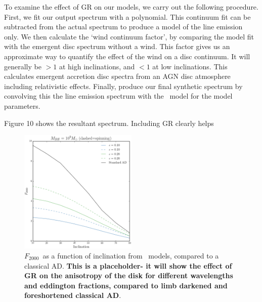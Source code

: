 \documentclass[preprint, a4paper, 11pt]{aastex}
\begin{document}
To examine the effect of GR on our models, we carry out the following procedure.
First, we fit our output spectrum with a polynomial. This continuum fit can 
be subtracted from the actual spectrum 
to produce a model of the line emission only. We then calculate the 
`wind continuum factor', by comparing the model fit with the emergent 
disc spectrum without a wind. This factor gives us an approximate way to quantify the 
effect of the wind on a disc continuum. It will generally be $>1$ at high inclinations,
and $<1$ at low inclinations. This calculates emergent accretion disc spectra from an AGN disc atmosphere
including relativistic effects. Finally, produce our final synthetic spectrum 
by convolving this the line emission spectrum with the \agn\ model for the model parameters.

Figure 10 shows the resultant spectrum. Including GR clearly helps




\begin{figure}
\centering
\includegraphics[width=0.5\textwidth]{figures/f2000_m9.eps}
\caption
{
$F_{2000}$\ as a function of inclination from
\agn\ models, compared to a classical AD. 
{\bf This is a placeholder- it will show the effect of GR on the anisotropy
of the disk for different wavelengths and eddington fractions, compared
to limb darkened and foreshortened classical AD}.
}
\label{fig:f2000}
\end{figure}
\end{document}
